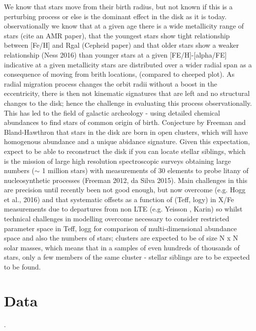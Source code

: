 \documentclass[12pt, preprint]{aastex}
\begin{document}
We know that stars move from their birth radius, but not known if this is a perturbing process or else is the dominant effect in the disk as it is today. observationally we know that at a given age there is a wide metallicity range of stars (cite an AMR paper), that the youngest stars show tight relationship between [Fe/H] and Rgal (Cepheid paper) and that older stars show  a weaker relationship (Ness 2016) than younger stars at a given [FE/H]-[alpha/FE] indicative at a given metallicity stars are distributed over a wider radial span as a consequence of moving from brith locations, (compared to cheeped plot). As radial migration process changes the orbit radii without a boost in the eccentricity, there is then not kinematic signatures that are left and no structural changes to the disk; hence the challenge in evaluating this process observationally. This has led to the field of galactic archeology - using detailed chemical abundances to find stars of common origin of birth. Conjecture by Freeman and Bland-Hawthron that stars in the disk are born in open clusters, which will have homogenous abundance and a unique abidance signature. Given this expectation, expect to be able to reconstruct the disk if you can locate stellar siblings, which is the mission of  large high resolution spectroscopic surveys obtaining large numbers ($\sim$ 1 million stars) with measurements of 30 elements to probe litany of nucleosynthetic processes (Freeman 2012, da Silva 2015). Main challenges in this are precision until recently been not good enough, but now overcome (e.g. Hogg et al., 2016) and that systematic offsets as a function of (Teff, logy) in X/Fe measurements due to departures from non LTE (e.g. Yeisson , Karin) so whilst technical challenges in modelling overcome necessary to consider restricted parameter space in Teff, logg for comparison of multi-dimensional abundance space and also the numbers of stars; clusters are expected to be of size N x N solar masses, which means that in a samples of even hundreds of thousands of stars, only a few members of the same cluster - stellar siblings are to be expected to be found. 

\section{Data}. 

\pagebreak

\end{document}
